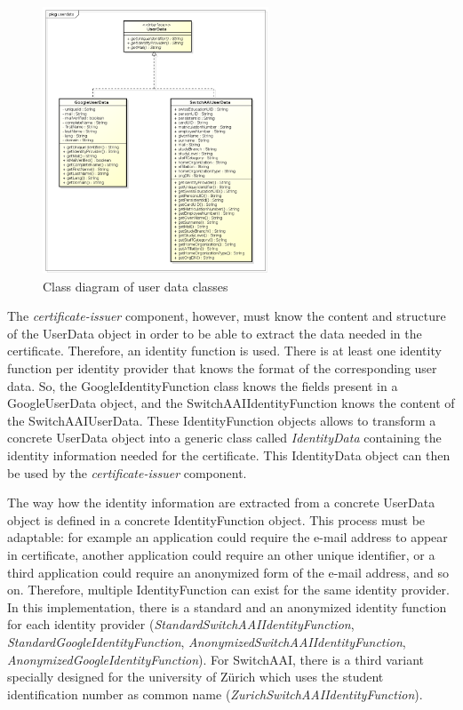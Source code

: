\documentclass[oneside]{scrreprt}
\begin{document}
\begin{figure}[ht]
\centerline{
\includegraphics[width=0.6\textwidth]{figs/userdata_class_diagram.png}}
\caption{Class diagram of user data classes}
\label{fig:userdata}
\end{figure}

The \textit{certificate-issuer} component, however, must know the content and structure of the UserData object in order to be able to extract the data needed in the certificate. Therefore, an identity function is used. There is at least one identity function per identity provider that knows the format of the corresponding user data. So, the GoogleIdentityFunction class knows the fields present in a GoogleUserData object, and the SwitchAAIIdentityFunction knows the content of the SwitchAAIUserData. These IdentityFunction objects allows to transform a concrete UserData object into a generic class called \textit{IdentityData} containing the identity information needed for the certificate. This IdentityData object can then be used by the \textit{certificate-issuer} component.

The way how the identity information are extracted from a concrete UserData object is defined in a concrete IdentityFunction object. This process must be adaptable: for example an application could require the e-mail address to appear in certificate, another application could require an other unique identifier, or a third application could require an anonymized form of the e-mail address, and so on. Therefore, multiple IdentityFunction can exist for the same identity provider. In this implementation, there is a standard and an anonymized identity function for each identity provider (\textit{StandardSwitchAAIIdentityFunction}, \textit{StandardGoogleIdentityFunction}, \textit{AnonymizedSwitchAAIIdentityFunction}, \textit{AnonymizedGoogleIdentityFunction}). For SwitchAAI, there is a third variant specially designed for the university of Zürich which uses the student identification number as common name (\textit{ZurichSwitchAAIIdentityFunction}).
\end{document}
